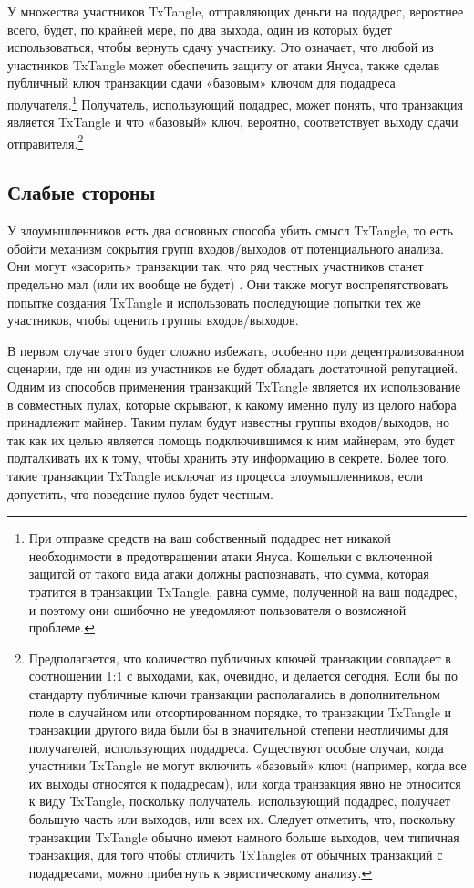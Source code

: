 У множества участников TxTangle, отправляющих деньги на подадрес, вероятнее всего, будет, по крайней мере, по два выхода, один из которых будет использоваться, чтобы вернуть сдачу участнику. Это означает, что любой из участников TxTangle может обеспечить защиту от атаки Януса, также сделав публичный ключ транзакции сдачи «базовым» ключом для подадреса получателя.\footnote{При отправке средств на ваш собственный подадрес нет никакой необходимости в предотвращении атаки Януса. Кошельки с включенной защитой от такого вида атаки должны распознавать, что сумма, которая тратится в транзакции TxTangle, равна сумме, полученной на ваш подадрес, и поэтому они ошибочно не уведомляют пользователя о возможной проблеме.} Получатель, использующий подадрес, может понять, что транзак\-ция является TxTangle и что «базовый» ключ, вероятно, соответствует выходу сдачи отправи\-теля.\footnote{Предполагается, что количество публичных ключей транзакции совпадает в соотношении 1:1 с выходами, как, очевидно, и делается сегодня. Если бы по стандарту публичные ключи транзакции располагались в дополнительном поле в случайном или отсортированном порядке, то транзакции TxTangle и транзакции другого вида были бы в значительной степени неотличимы для получателей, использующих подадреса. Существуют особые случаи, когда участники TxTangle не могут включить «базовый» ключ (например, когда все их выходы относятся к подадресам), или когда транзакция явно не относится к виду TxTangle, поскольку получатель, использующий подадрес, получает большую часть или выходов, или всех их. Следует отметить, что, поскольку транзакции TxTangle обычно имеют намного больше выходов, чем типичная транзакция, для того чтобы отличить TxTangles от обычных транзакций с подадресами, можно прибегнуть к эвристическому анализу.}


\subsection{Слабые стороны}
\label{subsec:weaknesses-txtangle}

У злоумышленников есть два основных способа убить смысл TxTangle, то есть обойти меха\-низм сокрытия групп входов/выходов от потенциального анализа. Они могут «засорить» транзакции так, что ряд честных участников станет предельно мал (или их вообще не будет) \cite{coinjoin-pollution}. Они также могут воспрепятствовать попытке создания TxTangle и использовать после\-дующие попытки тех же участников, чтобы оценить группы входов/выходов.

В первом случае этого будет сложно избежать, особенно при децентрализованном сценарии, где ни один из участников не будет обладать достаточной репутацией. Одним из способов применения транзакций TxTangle является их использование в совместных пулах, которые скрывают, к какому именно пулу из целого набора принадлежит майнер. Таким пулам будут известны группы входов/выходов, но так как их целью является помощь подключившимся к ним майнерам, это будет подталкивать их к тому, чтобы хранить эту информацию в секрете. Более того, такие транзакции TxTangle исключат из процесса злоумышленников, если допустить, что поведение пулов будет честным.

